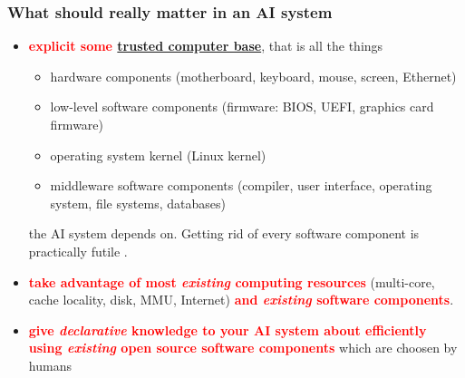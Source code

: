\documentclass[xcolor=svgnames,final,smaller,a4]{beamer}
\begin{document}
\begin{frame}
 \frametitle{What should really matter in an AI system}

 \begin{itemize}
   
 \item \textcolor{red}{\textbf{explicit some
     \href{https://en.wikipedia.org/wiki/Trusted_computing_base}{trusted
       computer base}}}, that is all the things

   \begin{itemize}
   \item hardware components (motherboard, keyboard, mouse, screen, Ethernet)
   \item low-level software components (firmware: BIOS, UEFI, graphics card firmware)
   \item operating system kernel (Linux kernel)
   \item middleware software components (compiler, user interface,
     operating system, file systems, databases)
   \end{itemize}
   
   the AI system depends on. Getting rid of every software component
   is practically futile {}.

   \item \textcolor{red}{\textbf{take advantage of most
       \emph{existing} computing resources}} (multi-core, cache
     locality, disk, MMU, Internet) \textcolor{red}{\textbf{and
         \emph{existing} software components}}.

   \item \textcolor{red}{\textbf{give \emph{declarative} knowledge
       to your AI system about efficiently using \emph{existing}
       open source software components}} which are choosen by humans
     
   \end{itemize}

 \end{frame}
\end{document}
